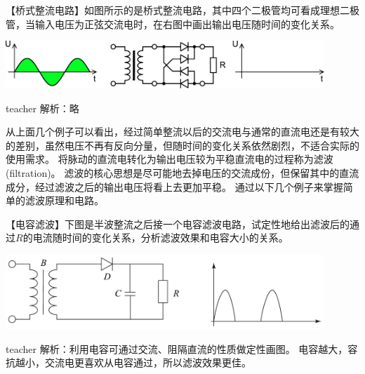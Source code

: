 \begin{example}

【桥式整流电路】如图所示的是桥式整流电路，其中四个二极管均可看成理想二极管，当输入电压为正弦交流电时，在右图中画出输出电压随时间的变化关系。
\begin{center}
\includegraphics[width = 0.9\textwidth]{images/alt-current-8.pdf} 
\end{center}
\begin{taggedblock}{teacher}
\noindent
解析：略
\end{taggedblock}
\end{example}


从上面几个例子可以看出，经过简单整流以后的交流电与通常的直流电还是有较大的差别，虽然电压不再有反向分量，但随时间的变化关系依然剧烈，不适合实际的使用需求。
将脉动的直流电转化为输出电压较为平稳直流电的过程称为{\heiti 滤波}(filtration)。
滤波的核心思想是尽可能地去掉电压的交流成份，但保留其中的直流成分，经过滤波之后的输出电压将看上去更加平稳。
通过以下几个例子来掌握简单的滤波原理和电路。


\begin{example}

【电容滤波】下图是半波整流之后接一个电容滤波电路，试定性地给出滤波后的通过$R$的电流随时间的变化关系，分析滤波效果和电容大小的关系。
\begin{center}
\includegraphics[width = 0.9\textwidth]{images/alt-current-9.pdf} 
\end{center}

\begin{taggedblock}{teacher}
\noindent
解析：利用电容可通过交流、阻隔直流的性质做定性画图。
电容越大，容抗越小，交流电更喜欢从电容通过，所以滤波效果更佳。
\end{taggedblock}
\end{example}


